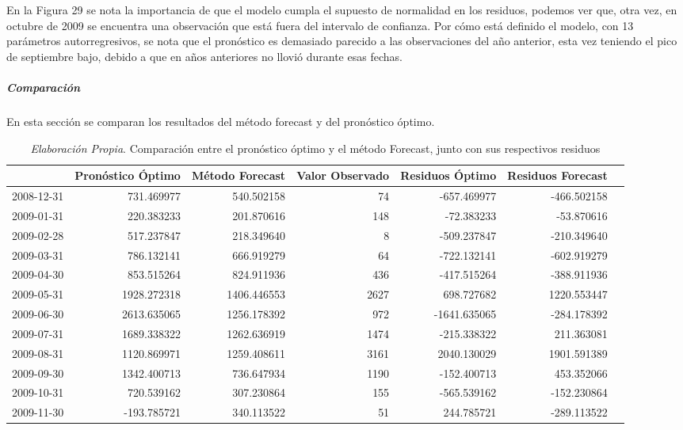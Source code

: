 \documentclass[12pt,letterpaper]{article}   %
\begin{document}
En la Figura 29 se nota la importancia de que el modelo cumpla el supuesto de normalidad en los residuos, podemos ver que, otra vez, en octubre de 2009 se encuentra una observación que está fuera del intervalo de confianza. Por cómo está definido el modelo, con 13 parámetros autorregresivos, se nota que el pronóstico es demasiado parecido a las observaciones del año anterior, esta vez teniendo el pico de septiembre bajo, debido a que en años anteriores no llovió durante esas fechas.



\newpage
\subparagraph{Comparación}
En esta sección se comparan los resultados del método forecast y del pronóstico óptimo.
\begin{table}[ht]
\tiny
\centering
\begin{tabular}{lrrrrrr}
\toprule
 & \textbf{Pronóstico Óptimo} & \textbf{Método Forecast} & \textbf{Valor Observado} & \textbf{Residuos Óptimo} & \textbf{Residuos Forecast} \\
\midrule
2008-12-31 & 731.469977 & 540.502158 & 74 & -657.469977 & -466.502158 \\
2009-01-31 & 220.383233 & 201.870616 & 148 & -72.383233 & -53.870616 \\
2009-02-28 & 517.237847 & 218.349640 & 8 & -509.237847 & -210.349640 \\
2009-03-31 & 786.132141 & 666.919279 & 64 & -722.132141 & -602.919279 \\
2009-04-30 & 853.515264 & 824.911936 & 436 & -417.515264 & -388.911936 \\
2009-05-31 & 1928.272318 & 1406.446553 & 2627 & 698.727682 & 1220.553447 \\
2009-06-30 & 2613.635065 & 1256.178392 & 972 & -1641.635065 & -284.178392 \\
2009-07-31 & 1689.338322 & 1262.636919 & 1474 & -215.338322 & 211.363081 \\
2009-08-31 & 1120.869971 & 1259.408611 & 3161 & 2040.130029 & 1901.591389 \\
2009-09-30 & 1342.400713 & 736.647934 & 1190 & -152.400713 & 453.352066 \\
2009-10-31 & 720.539162 & 307.230864 & 155 & -565.539162 & -152.230864 \\
2009-11-30 & -193.785721 & 340.113522 & 51 & 244.785721 & -289.113522 \\
\bottomrule
\end{tabular}
\caption{\textit{Elaboración Propia}. Comparación entre el pronóstico óptimo y el método Forecast, junto con sus respectivos residuos}
\end{table}
\end{document}
